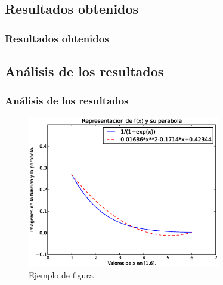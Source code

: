 \documentclass{beamer}
\begin{document}
\subsection{Resultados obtenidos}
\begin{frame}
\frametitle{Resultados obtenidos}



\end{frame}


\subsection{Análisis de los resultados}
\begin{frame}
\frametitle{Análisis de los resultados}

\begin{figure}[!th]
\begin{center}
\includegraphics[width=0.75\textwidth]{img/rep_funcion.eps}
\caption{Ejemplo de figura}
\label{fig:1}
\end{center}
\end{figure}

\end{frame}
\end{document}

